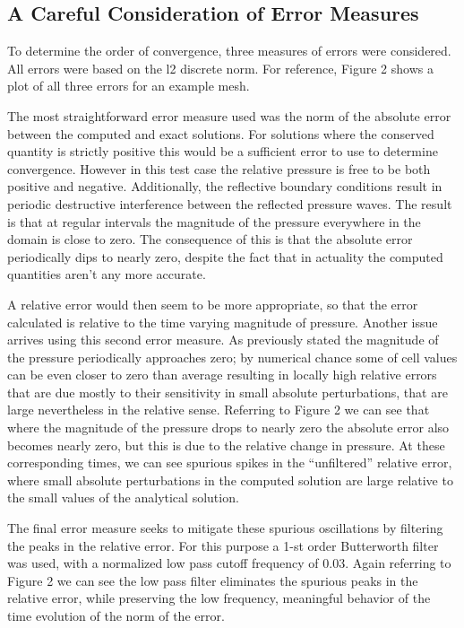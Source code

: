 \documentclass[letterpaper,10pt]{article}
\begin{document}
\subsection*{A Careful Consideration of Error Measures}
To determine the order of convergence, three measures of errors were considered. All errors were based on the l2 discrete norm. For reference, Figure 2 shows a plot of all three errors for an example mesh.

The most straightforward error measure used was the norm of the absolute error between the computed and exact solutions. For solutions where the conserved quantity is strictly positive this would be a sufficient error to use to determine convergence. However in this test case the relative pressure is free to be both positive and negative. Additionally, the reflective boundary conditions result in periodic destructive interference between the reflected pressure waves. The result is that at regular intervals the magnitude of the pressure everywhere in the domain is close to zero. The consequence of this is that the absolute error periodically dips to nearly zero, despite the fact that in actuality the computed quantities aren't any more accurate.

A relative error would then seem to be more appropriate, so that the error calculated is relative to the time varying magnitude of pressure. Another issue arrives using this second error measure. As previously stated the magnitude of the pressure periodically approaches zero; by numerical chance some of cell values can be even closer to zero than average resulting in locally high relative errors that are due mostly to their sensitivity in small absolute perturbations, that are large nevertheless in the relative sense. Referring to Figure 2 we can see that where the magnitude of the pressure drops to nearly zero the absolute error also becomes nearly zero, but this is due to the relative change in pressure. At these corresponding times, we can see spurious spikes in the ``unfiltered'' relative error, where small absolute perturbations in the computed solution are large relative to the small values of the analytical solution.

The final error measure seeks to mitigate these spurious oscillations by filtering the peaks in the relative error. For this purpose a 1-st order Butterworth filter was used, with a normalized low pass cutoff frequency of 0.03. Again referring to Figure 2 we can see the low pass filter eliminates the spurious peaks in the relative error, while preserving the low frequency, meaningful behavior of the time evolution of the norm of the error.
\end{document}
